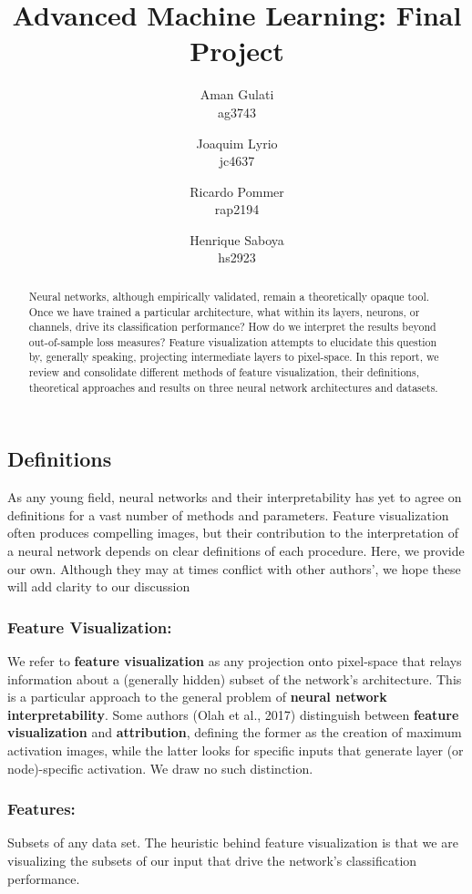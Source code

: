 \documentclass[12pt]{article}
\title{Advanced Machine Learning: Final Project}
\author{
	Aman Gulati \\
	ag3743 \\
	\and 
	Joaquim Lyrio  \\
	jc4637 \\
	\and 
	Ricardo Pommer \\
	rap2194 \\
	\and
	Henrique Saboya \\
	hs2923 \\
}
\begin{document}
\maketitle

\begin{abstract}
	Neural networks, although empirically validated, remain a theoretically opaque tool. Once we have trained a particular architecture, what within its layers, neurons, or channels, drive its classification performance? How do we interpret the results beyond out-of-sample loss measures? Feature visualization attempts to elucidate this question by, generally speaking, projecting intermediate layers to pixel-space. In this report,  we review and consolidate different methods of feature visualization, their definitions, theoretical approaches and results on three neural network architectures and datasets.
\end{abstract}

\subsection{Definitions}
As any young field, neural networks and their interpretability has yet to agree on definitions for a vast number of methods and parameters. Feature visualization often produces compelling images, but their contribution to the interpretation of a neural network depends on clear definitions of each procedure. Here, we provide our own. Although they may at times conflict with other authors', we hope these will add clarity to our discussion

\subsubsection{Feature Visualization:}
We refer to \textbf{feature visualization} as any projection onto pixel-space that relays information about a (generally hidden) subset of the network's architecture. This is a particular approach to the general problem of \textbf{neural network interpretability}. Some authors (Olah et al., 2017) distinguish between \textbf{feature visualization} and \textbf{attribution}, defining the former as the creation of maximum activation images, while the latter looks for specific inputs that generate layer (or node)-specific activation. We draw no such distinction.

\subsubsection{Features:}
Subsets of any data set. The heuristic behind feature visualization is that we are visualizing the subsets of our input that drive the network's classification performance.
\end{document}
